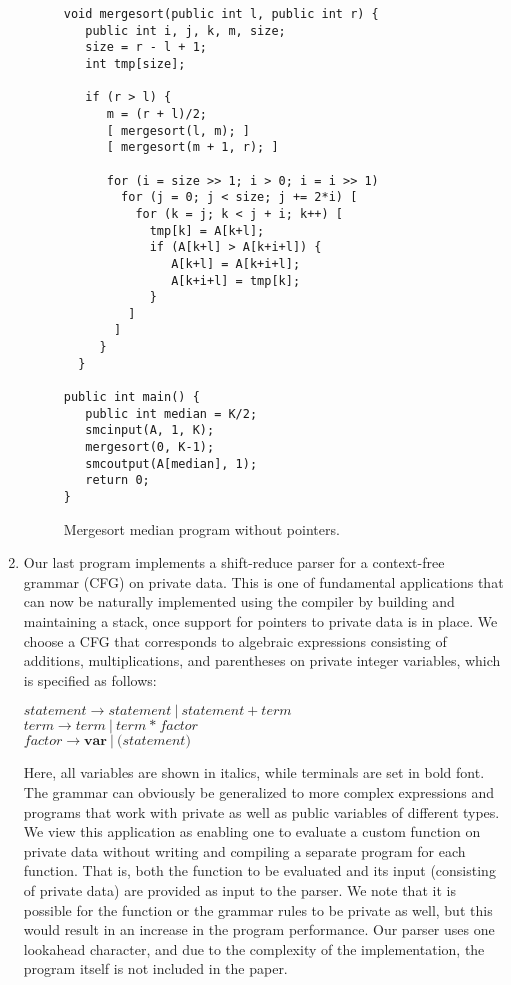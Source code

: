 \documentclass[11pt]{article}
\begin{document}
\begin{enumerate}
\begin{figure}[t!]
\begin{verbatim}
void mergesort(public int l, public int r) {
   public int i, j, k, m, size;
   size = r - l + 1;
   int tmp[size];
   
   if (r > l) {
      m = (r + l)/2;
      [ mergesort(l, m); ]
      [ mergesort(m + 1, r); ]
      
      for (i = size >> 1; i > 0; i = i >> 1) 
        for (j = 0; j < size; j += 2*i) [
          for (k = j; k < j + i; k++) [
            tmp[k] = A[k+l];
            if (A[k+l] > A[k+i+l]) {
               A[k+l] = A[k+i+l];
               A[k+i+l] = tmp[k];
            }
         ]
       ]
     }
  }
  
public int main() {
   public int median = K/2;
   smcinput(A, 1, K);
   mergesort(0, K-1);
   smcoutput(A[median], 1);
   return 0;
}\end{verbatim}
\caption{Mergesort median program without pointers.} \label{fig:ms}
\end{figure}

\item Our last program implements a shift-reduce parser for a context-free
  grammar (CFG) on private data. This is one of fundamental applications
  that can now be naturally implemented using the compiler by building and
  maintaining a stack, once support for pointers to private data is in place.
  We choose a CFG that corresponds to algebraic expressions consisting of
  additions, multiplications, and parentheses on private integer variables,
  which is specified as follows:
  
  \smallskip
 $\textit{statement} \rightarrow \textit{statement}\ |\ \textit{statement}\ 
 \textbf{+}\ \textit{term}$\\
 $\textit{term} \rightarrow \textit{term}\ |\ \textit{term}\ \textbf{*}\ 
 \textit{factor}$\\
 $\textit{factor} \rightarrow \textbf{var}\ |\
 \textbf{(}\textit{statement}\textbf{)}$

  \smallskip Here, all variables are shown in italics, while terminals are
  set in bold font. The grammar can obviously be generalized to more complex
  expressions and programs that work with private as well as public
  variables of different types. We view this application as enabling one to
  evaluate a custom function on private data without writing and compiling a
  separate program for each function. That is, both the function to be
  evaluated and its input (consisting of private data) are provided as input
  to the parser. We note that it is possible for the function or the grammar
  rules to be private as well, but this would result in an increase in the
  program performance. Our parser uses one lookahead character, and due to
  the complexity of the implementation, the program itself is not included
  in the paper.  
  

\end{enumerate}
\end{document}
